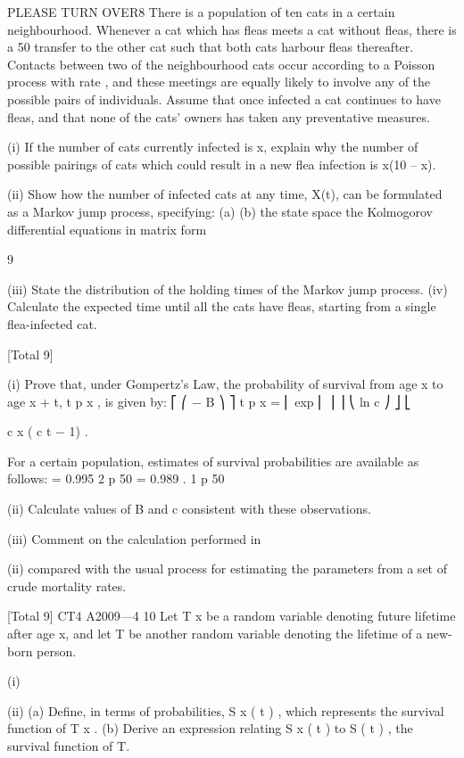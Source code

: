 PLEASE TURN OVER8
There is a population of ten cats in a certain neighbourhood. Whenever a cat which
has fleas meets a cat without fleas, there is a 50%
transfer to the other cat such that both cats harbour fleas thereafter. Contacts between
two of the neighbourhood cats occur according to a Poisson process with rate \mu, and
these meetings are equally likely to involve any of the possible pairs of individuals.
Assume that once infected a cat continues to have fleas, and that none of the cats’
owners has taken any preventative measures.
\item (i) If the number of cats currently infected is x, explain why the number of
possible pairings of cats which could result in a new flea infection is x(10 – x).

\item (ii) Show how the number of infected cats at any time, X(t), can be formulated as
a Markov jump process, specifying:
(a)
(b)
the state space
the Kolmogorov differential equations in matrix form

9
\item (iii) State the distribution of the holding times of the Markov jump process.
(iv) Calculate the expected time until all the cats have fleas, starting from a single
flea-infected cat.

[Total 9]



\item (i) Prove that, under Gompertz’s Law, the probability of survival from age x to
age x + t, t p x , is given by:
⎡
⎛ − B ⎞ ⎤
t p x = ⎢ exp ⎜
⎟ ⎥
⎝ ln c ⎠ ⎦
⎣

c x ( c t − 1)
.

For a certain population, estimates of survival probabilities are available as follows:
= 0.995
2 p 50 = 0.989 .
1 p 50
\item (ii) Calculate values of B and c consistent with these observations.
\item (iii) Comment on the calculation performed in \item (ii) compared with the usual process
for estimating the parameters from a set of crude mortality rates.

[Total 9]
CT4 A2009—4
10
Let T x be a random variable denoting future lifetime after age x, and let T be
another random variable denoting the lifetime of a new-born person.
\item (i)
\item (ii)
(a) Define, in terms of probabilities, S x ( t ) , which represents the survival
function of T x .
(b) Derive an expression relating S x ( t ) to S ( t ) , the survival function of T.

